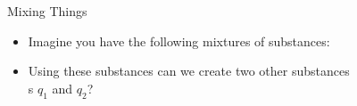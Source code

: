 \documentclass{beamer}
\begin{document}
\begin{frame}{Mixing Things}
    \begin{itemize}
        \item Imagine you have the following 
        mixtures of substances:
    \end{itemize}
    
        \begin{table}[h]
            \centering
        \end{table}
    \begin{itemize}
        \item Using these substances can we create two other substances \\s $q_1$ and $q_2$?
    \end{itemize}
    \begin{table}[h]
            \centering
        \end{table}
\end{frame}
\end{document}
